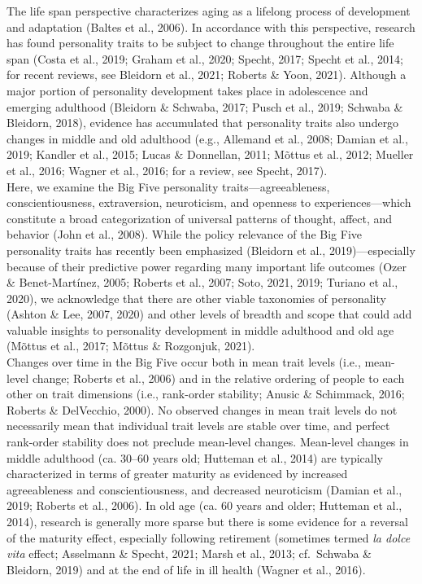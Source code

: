 \documentclass[
  english,
  man, noextraspace]{apa7}
\begin{document}
The life span perspective characterizes aging as a lifelong process of development and adaptation (Baltes et al., 2006). In accordance with this perspective, research has found personality traits to be subject to change throughout the entire life span (Costa et al., 2019; Graham et al., 2020; Specht, 2017; Specht et al., 2014; for recent reviews, see Bleidorn et al., 2021; Roberts \& Yoon, 2021). Although a major portion of personality development takes place in adolescence and emerging adulthood (Bleidorn \& Schwaba, 2017; Pusch et al., 2019; Schwaba \& Bleidorn, 2018), evidence has accumulated that personality traits also undergo changes in middle and old adulthood (e.g., Allemand et al., 2008; Damian et al., 2019; Kandler et al., 2015; Lucas \& Donnellan, 2011; Mõttus et al., 2012; Mueller et al., 2016; Wagner et al., 2016; for a review, see Specht, 2017).\\
Here, we examine the Big Five personality traits---agreeableness, conscientiousness, extraversion, neuroticism, and openness to experiences---which constitute a broad categorization of universal patterns of thought, affect, and behavior (John et al., 2008). While the policy relevance of the Big Five personality traits has recently been emphasized (Bleidorn et al., 2019)---especially because of their predictive power regarding many important life outcomes (Ozer \& Benet-Martínez, 2005; Roberts et al., 2007; Soto, 2021, 2019; Turiano et al., 2020), we acknowledge that there are other viable taxonomies of personality (Ashton \& Lee, 2007, 2020) and other levels of breadth and scope that could add valuable insights to personality development in middle adulthood and old age (Mõttus et al., 2017; Mõttus \& Rozgonjuk, 2021).\\
Changes over time in the Big Five occur both in mean trait levels (i.e., mean-level change; Roberts et al., 2006) and in the relative ordering of people to each other on trait dimensions (i.e., rank-order stability; Anusic \& Schimmack, 2016; Roberts \& DelVecchio, 2000). No observed changes in mean trait levels do not necessarily mean that individual trait levels are stable over time, and perfect rank-order stability does not preclude mean-level changes. Mean-level changes in middle adulthood (ca. 30--60 years old; Hutteman et al., 2014) are typically characterized in terms of greater maturity as evidenced by increased agreeableness and conscientiousness, and decreased neuroticism (Damian et al., 2019; Roberts et al., 2006). In old age (ca. 60 years and older; Hutteman et al., 2014), research is generally more sparse but there is some evidence for a reversal of the maturity effect, especially following retirement (sometimes termed \emph{la dolce vita} effect; Asselmann \& Specht, 2021; Marsh et al., 2013; cf.~Schwaba \& Bleidorn, 2019) and at the end of life in ill health (Wagner et al., 2016).\\
\end{document}

